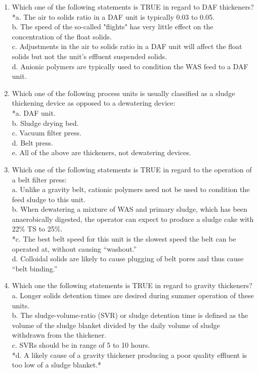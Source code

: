 \documentclass{article}
\begin{document}
\begin{enumerate}
\item  Which one of the following statements is TRUE in regard to DAF thickeners? \\

*a. The air to solids ratio in a DAF unit is typically 0.03 to 0.05. \\
b. The speed of the so-called "flights" has very little effect on the concentration of the float solids. \\
c. Adjustments in the air to solids ratio in a DAF unit will affect the float solids but not the unit's effluent suspended solids. \\
d. Anionic polymers are typically used to condition the WAS feed to a DAF unit. \\

\item  Which one of the following process units is usually classified as a sludge thickening device as opposed to a dewatering device: \\

*a. DAF unit. \\
b. Sludge drying bed. \\
c. Vacuum filter press. \\
d. Belt press. \\
e. All of the above are thickeners, not dewatering devices. \\

\item  Which one of the following statements is TRUE in regard to the operation of a belt filter press: \\

a. Unlike a gravity belt, cationic polymers need not be used to condition the feed sludge to this unit. \\
b. When dewatering a mixture of WAS and primary sludge, which has been anaerobically digested, the operator can expect to produce a sludge cake with 22\% TS to 25\%. \\
*c. The best belt speed for this unit is the slowest speed the belt can be operated at, without causing “washout.” \\
d. Colloidal solids are likely to cause plugging of belt pores and thus cause “belt binding.” \\

\item  Which one the following statements is TRUE in regard to gravity thickeners? \\

a. Longer solids detention times are desired during summer operation of these units. \\
b. The sludge-volume-ratio (SVR) or sludge detention time is defined as the volume of the sludge blanket divided by the daily volume of sludge withdrawn from the thickener. \\
c. SVRs should be in range of 5 to 10 hours. \\
*d. A likely cause of a gravity thickener producing a poor quality effluent is too low of a sludge blanket.* \\


\end{enumerate}
\end{document}
